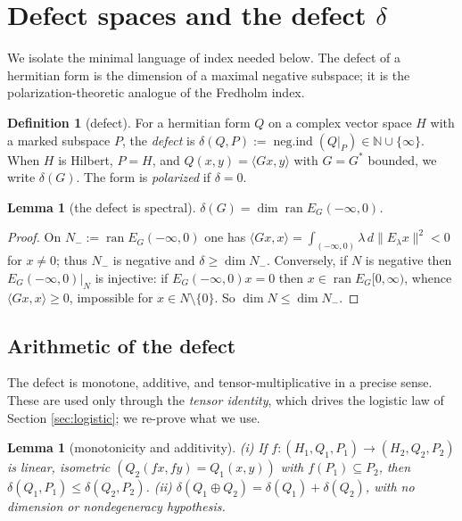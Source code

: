 \documentclass[11pt,reqno]{amsart}
\newtheorem{lemma}[theorem]{Lemma}
\theoremstyle{definition}
\newtheorem{definition}[theorem]{Definition}
\newcommand{\negind}{\operatorname{neg.ind}}
\newcommand{\ran}{\operatorname{ran}}
\newcommand{\N}{\mathbb{N}}
\begin{document}
\section{Defect spaces and the defect \texorpdfstring{$\delta$}{delta}}
\label{sec:defect}

We isolate the minimal language of index needed below. The defect of a hermitian
form is the dimension of a maximal negative subspace; it is the
polarization-theoretic analogue of the Fredholm index.

\begin{definition}[defect]\label{def:defect}
For a hermitian form \(Q\) on a complex vector space \(H\) with a marked
subspace \(P\), the \emph{defect} is
\(\delta(Q,P):=\negind(Q|_P)\in\N\cup\{\infty\}\). When \(H\) is Hilbert,
\(P=H\), and \(Q(x,y)=\langle Gx,y\rangle\) with \(G=G^*\) bounded, we write
\(\delta(G)\). The form is \emph{polarized} if \(\delta=0\).
\end{definition}

\begin{lemma}[the defect is spectral]\label{lem:defect-spectral}
\(\delta(G)=\dim\ran E_G(-\infty,0)\).
\end{lemma}

\begin{proof}
On \(N_-:=\ran E_G(-\infty,0)\) one has
\(\langle Gx,x\rangle=\int_{(-\infty,0)}\lambda\,d\|E_\lambda x\|^2<0\) for
\(x\neq0\); thus \(N_-\) is negative and \(\delta\geq\dim N_-\). Conversely, if
\(N\) is negative then \(E_G(-\infty,0)|_N\) is injective: if
\(E_G(-\infty,0)x=0\) then \(x\in\ran E_G[0,\infty)\), whence
\(\langle Gx,x\rangle\geq0\), impossible for \(x\in N\setminus\{0\}\). So
\(\dim N\leq\dim N_-\).
\end{proof}

\subsection{Arithmetic of the defect}
The defect is monotone, additive, and tensor-multiplicative in a precise sense.
These are used only through the \emph{tensor identity}, which drives the
logistic law of Section \ref{sec:logistic}; we re-prove what we use.

\begin{lemma}[monotonicity and additivity]\label{lem:mono-add}
\textup{(i)} If \(f\colon(H_1,Q_1,P_1)\to(H_2,Q_2,P_2)\) is linear, isometric
\((Q_2(fx,fy)=Q_1(x,y))\) with \(f(P_1)\subseteq P_2\), then
\(\delta(Q_1,P_1)\leq\delta(Q_2,P_2)\). \textup{(ii)}
\(\delta(Q_1\oplus Q_2)=\delta(Q_1)+\delta(Q_2)\), with no dimension or
nondegeneracy hypothesis.
\end{lemma}
\end{document}
